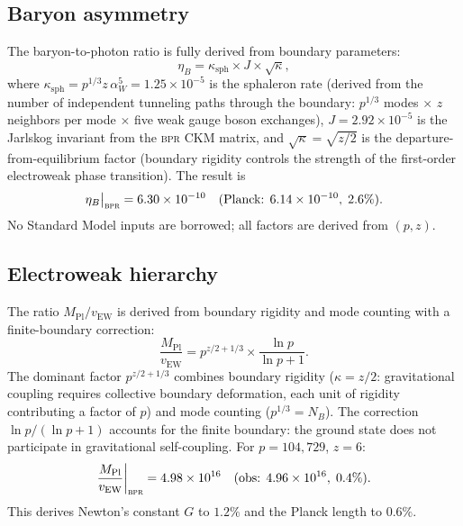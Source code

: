 \documentclass[aps,prd,twocolumn,superscriptaddress,longbibliography,nofootinbib]{revtex4-2}
\newcommand{\vEW}{v_{\mathrm{EW}}}
\newcommand{\MPl}{M_{\mathrm{Pl}}}
\newcommand{\bpr}{\textsc{bpr}}
\begin{document}
\subsection{Baryon asymmetry}

The baryon-to-photon ratio is fully derived from boundary parameters:
\begin{equation}
\eta_B = \kappa_{\mathrm{sph}} \times J \times \sqrt{\kappa},
\label{eq:eta}
\end{equation}
where $\kappa_{\mathrm{sph}} = p^{1/3} z\, \alpha_W^5 = 1.25\times10^{-5}$
is the sphaleron rate (derived from the number of independent tunneling
paths through the boundary: $p^{1/3}$ modes $\times$ $z$ neighbors per mode
$\times$ five weak gauge boson exchanges), $J = 2.92\times10^{-5}$ is the
Jarlskog invariant from the \bpr{} CKM matrix, and $\sqrt{\kappa} = \sqrt{z/2}$
is the departure-from-equilibrium factor (boundary rigidity controls the
strength of the first-order electroweak phase transition).
The result is
\begin{equation}
\eta_B\big|_{\bpr} = 6.30 \times 10^{-10}
\quad (\text{Planck: }6.14 \times 10^{-10},\; 2.6\%).
\end{equation}
No Standard Model inputs are borrowed; all factors are derived from $(p, z)$.

\subsection{Electroweak hierarchy}

The ratio $\MPl / \vEW$ is derived from boundary rigidity and mode counting
with a finite-boundary correction:
\begin{equation}
\frac{\MPl}{\vEW} = p^{z/2 + 1/3} \times \frac{\ln p}{\ln p + 1}.
\label{eq:hierarchy}
\end{equation}
The dominant factor $p^{z/2+1/3}$ combines boundary rigidity ($\kappa = z/2$:
gravitational coupling requires collective boundary deformation, each unit
of rigidity contributing a factor of $p$) and mode counting ($p^{1/3} = N_B$).
The correction $\ln p/(\ln p + 1)$ accounts for the finite boundary: the
ground state does not participate in gravitational self-coupling.
For $p = 104{,}729$, $z = 6$:
\begin{equation}
\frac{\MPl}{\vEW}\bigg|_{\bpr} = 4.98 \times 10^{16}
\quad (\text{obs: }4.96 \times 10^{16},\; 0.4\%).
\end{equation}
This derives Newton's constant $G$ to $1.2\%$ and the Planck length to $0.6\%$.
\end{document}
